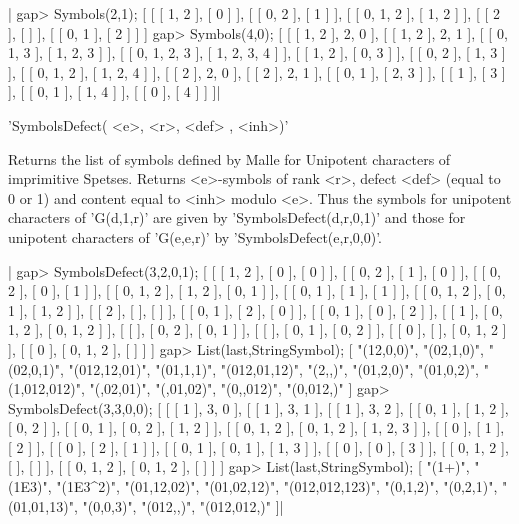 |    gap> Symbols(2,1);
    [ [ [ 1, 2 ], [ 0 ] ], [ [ 0, 2 ], [ 1 ] ], [ [ 0, 1, 2 ], [ 1, 2 ] ],
      [ [ 2 ], [  ] ], [ [ 0, 1 ], [ 2 ] ] ]
    gap> Symbols(4,0);
    [ [ [ 1, 2 ], 2, 0 ], [ [ 1, 2 ], 2, 1 ],
      [ [ 0, 1, 3 ], [ 1, 2, 3 ] ], [ [ 0, 1, 2, 3 ], [ 1, 2, 3, 4 ] ],
      [ [ 1, 2 ], [ 0, 3 ] ], [ [ 0, 2 ], [ 1, 3 ] ],
      [ [ 0, 1, 2 ], [ 1, 2, 4 ] ], [ [ 2 ], 2, 0 ], [ [ 2 ], 2, 1 ],
      [ [ 0, 1 ], [ 2, 3 ] ], [ [ 1 ], [ 3 ] ], [ [ 0, 1 ], [ 1, 4 ] ],
      [ [ 0 ], [ 4 ] ] ]|


'SymbolsDefect( <e>, <r>, <def> , <inh>)'

Returns  the list of  symbols defined by  Malle for Unipotent characters of
imprimitive  Spetses. Returns <e>-symbols of  rank <r>, defect <def> (equal
to  0 or  1) and  content equal  to <inh>  modulo <e>. Thus the symbols for
unipotent  characters of  'G(d,1,r)' are  given by 'SymbolsDefect(d,r,0,1)'
and those for unipotent characters of 'G(e,e,r)' by
'SymbolsDefect(e,r,0,0)'.

|    gap> SymbolsDefect(3,2,0,1);
    [ [ [ 1, 2 ], [ 0 ], [ 0 ] ], [ [ 0, 2 ], [ 1 ], [ 0 ] ],
      [ [ 0, 2 ], [ 0 ], [ 1 ] ], [ [ 0, 1, 2 ], [ 1, 2 ], [ 0, 1 ] ],
      [ [ 0, 1 ], [ 1 ], [ 1 ] ], [ [ 0, 1, 2 ], [ 0, 1 ], [ 1, 2 ] ],
      [ [ 2 ], [  ], [  ] ], [ [ 0, 1 ], [ 2 ], [ 0 ] ],
      [ [ 0, 1 ], [ 0 ], [ 2 ] ], [ [ 1 ], [ 0, 1, 2 ], [ 0, 1, 2 ] ],
      [ [  ], [ 0, 2 ], [ 0, 1 ] ], [ [  ], [ 0, 1 ], [ 0, 2 ] ],
      [ [ 0 ], [  ], [ 0, 1, 2 ] ], [ [ 0 ], [ 0, 1, 2 ], [  ] ] ]
    gap> List(last,StringSymbol);
    [ "(12,0,0)", "(02,1,0)", "(02,0,1)", "(012,12,01)", "(01,1,1)",
      "(012,01,12)", "(2,,)", "(01,2,0)", "(01,0,2)", "(1,012,012)",
      "(,02,01)", "(,01,02)", "(0,,012)", "(0,012,)" ]
    gap> SymbolsDefect(3,3,0,0);
    [ [ [ 1 ], 3, 0 ], [ [ 1 ], 3, 1 ], [ [ 1 ], 3, 2 ], 
      [ [ 0, 1 ], [ 1, 2 ], [ 0, 2 ] ], [ [ 0, 1 ], [ 0, 2 ], [ 1, 2 ] ], 
      [ [ 0, 1, 2 ], [ 0, 1, 2 ], [ 1, 2, 3 ] ], [ [ 0 ], [ 1 ], [ 2 ] ], 
      [ [ 0 ], [ 2 ], [ 1 ] ], [ [ 0, 1 ], [ 0, 1 ], [ 1, 3 ] ], 
      [ [ 0 ], [ 0 ], [ 3 ] ], [ [ 0, 1, 2 ], [  ], [  ] ], 
      [ [ 0, 1, 2 ], [ 0, 1, 2 ], [  ] ] ]
    gap> List(last,StringSymbol);
    [ "(1+)", "(1E3)", "(1E3^2)", "(01,12,02)", "(01,02,12)", 
      "(012,012,123)", "(0,1,2)", "(0,2,1)", "(01,01,13)", "(0,0,3)", 
      "(012,,)", "(012,012,)" ]|

%
%

